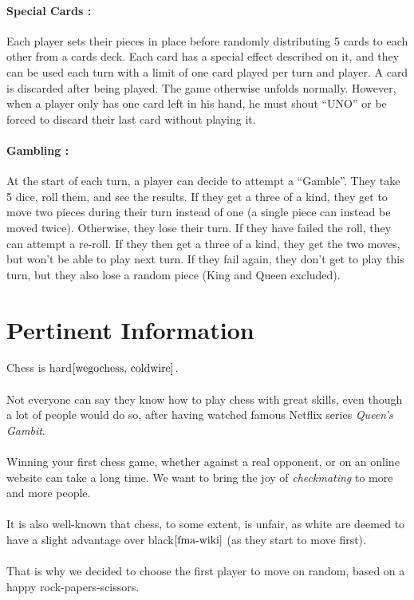 \documentclass[12pt]{article}
\begin{document}
            \paragraph{Special Cards :\\}
                Each player sets their pieces in place before randomly distributing 5 cards to each other from a cards deck. Each card has a special effect described on it, and they can be used each turn with a limit of one card played per turn and player. A card is discarded after being played.
                The game otherwise unfolds normally. However, when a player only has one card left in his hand, he must shout “UNO” or be forced to discard their last card without playing it.
            
            
            \paragraph{Gambling :\\}
                At the start of each turn, a player can decide to attempt a “Gamble”. They take 5 dice, roll them, and see the results. If they get a three of a kind, they get to move two pieces during their turn instead of one (a single piece can instead be moved twice). Otherwise, they lose their turn.
                If they have failed the roll, they can attempt a re-roll. If they then get a three of a kind, they get the two moves, but won't be able to play next turn. If they fail again, they don’t get to play this turn, but they also lose a random piece (King and Queen excluded).

    \section{Pertinent Information}
        Chess is hard$\cite{wegochess, coldwire}$.
        \\\\Not everyone can say they know how to play chess with great skills, even though a lot of people would do so, after having watched famous Netflix series \textit{Queen's Gambit}.
        \\\\Winning your first chess game, whether against a real opponent, or on an online website can take a long time. We want to bring the joy of \textit{checkmating} to more and more people.
        \\\\It is also well-known that chess, to some extent, is unfair, as white are deemed to have a slight advantage over black$\cite{fma-wiki}$  (as they start to move first).
        \\\\That is why we decided to choose the first player to move on random, based on a happy rock-papers-scissors.
    
\end{document}

